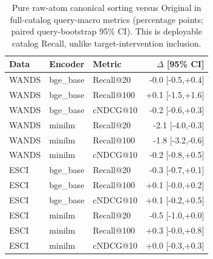 \begin{table}[t]\caption{Pure raw-atom canonical sorting versus Original in full-catalog query-macro metrics (percentage points; paired query-bootstrap 95\% CI). This is deployable catalog Recall, unlike target-intervention inclusion.}\label{tab:cancatalog}\centering\scriptsize
\begin{tabular}{lllr}\toprule Data&Encoder&Metric&$\Delta$ [95\% CI]\\\midrule
WANDS & bge\_base & Recall@20 & -0.0 [-0.5,+0.4]\\
WANDS & bge\_base & Recall@100 & +0.1 [-1.5,+1.6]\\
WANDS & bge\_base & cNDCG@10 & -0.2 [-0.6,+0.3]\\
WANDS & minilm & Recall@20 & -2.1 [-4.0,-0.3]\\
WANDS & minilm & Recall@100 & -1.8 [-3.2,-0.6]\\
WANDS & minilm & cNDCG@10 & -0.2 [-0.8,+0.5]\\
ESCI & bge\_base & Recall@20 & -0.3 [-0.7,+0.1]\\
ESCI & bge\_base & Recall@100 & +0.1 [-0.0,+0.2]\\
ESCI & bge\_base & cNDCG@10 & +0.1 [-0.2,+0.5]\\
ESCI & minilm & Recall@20 & -0.5 [-1.0,+0.0]\\
ESCI & minilm & Recall@100 & +0.3 [-0.0,+0.8]\\
ESCI & minilm & cNDCG@10 & +0.0 [-0.3,+0.3]\\
\bottomrule\end{tabular}\end{table}
